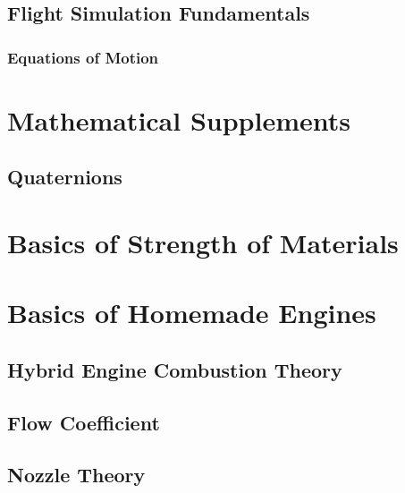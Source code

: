 \documentclass[uplatex,dvipdfmx,a4paper,11pt]{report}
\numberwithin{equation}{chapter}
\begin{document}
\section{Flight Simulation Fundamentals}
\subsection{Equations of Motion}

\appendix

\chapter{Mathematical Supplements}
\section{Quaternions}

\chapter{Basics of Strength of Materials}

\chapter{Basics of Homemade Engines}
\section{Hybrid Engine Combustion Theory}
\section{Flow Coefficient}
\section{Nozzle Theory}
\end{document}
